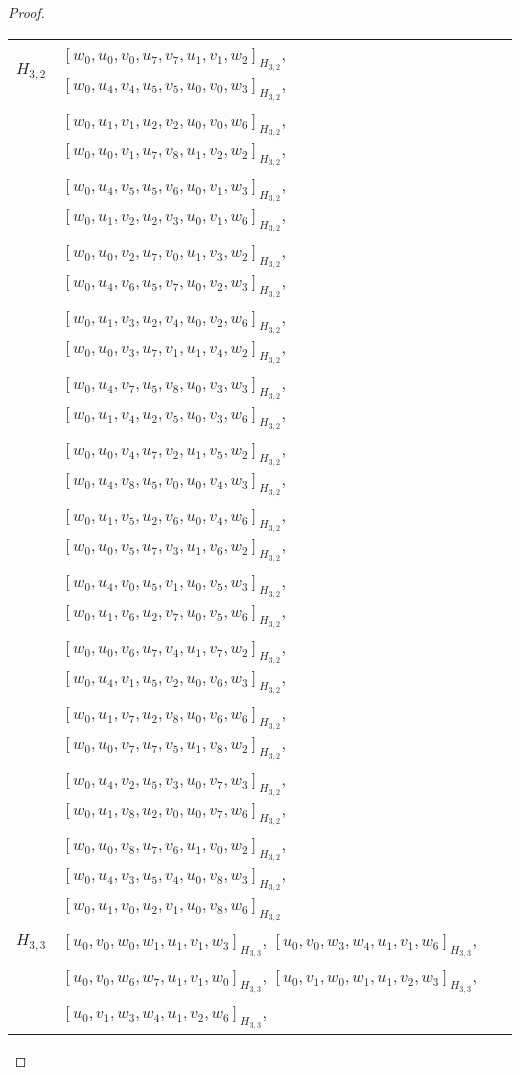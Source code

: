 \begin{subappendices}
\begin{proof}
{ \small
\begin{longtable}{|c|l|}
\hline
$H_{3,2}$ &
  $[w_0, u_0, v_0, u_7, v_7, u_1, v_1, w_2]_{H_{3,2}}$,
  $[w_0, u_4, v_4, u_5, v_5, u_0, v_0, w_3]_{H_{3,2}}$, \\* &
  $[w_0, u_1, v_1, u_2, v_2, u_0, v_0, w_6]_{H_{3,2}}$,
  $[w_0, u_0, v_1, u_7, v_8, u_1, v_2, w_2]_{H_{3,2}}$, \\* &
  $[w_0, u_4, v_5, u_5, v_6, u_0, v_1, w_3]_{H_{3,2}}$,
  $[w_0, u_1, v_2, u_2, v_3, u_0, v_1, w_6]_{H_{3,2}}$, \\* &
  $[w_0, u_0, v_2, u_7, v_0, u_1, v_3, w_2]_{H_{3,2}}$,
  $[w_0, u_4, v_6, u_5, v_7, u_0, v_2, w_3]_{H_{3,2}}$, \\* &
  $[w_0, u_1, v_3, u_2, v_4, u_0, v_2, w_6]_{H_{3,2}}$,
  $[w_0, u_0, v_3, u_7, v_1, u_1, v_4, w_2]_{H_{3,2}}$, \\* &
  $[w_0, u_4, v_7, u_5, v_8, u_0, v_3, w_3]_{H_{3,2}}$,
  $[w_0, u_1, v_4, u_2, v_5, u_0, v_3, w_6]_{H_{3,2}}$, \\* &
  $[w_0, u_0, v_4, u_7, v_2, u_1, v_5, w_2]_{H_{3,2}}$,
  $[w_0, u_4, v_8, u_5, v_0, u_0, v_4, w_3]_{H_{3,2}}$, \\* &
  $[w_0, u_1, v_5, u_2, v_6, u_0, v_4, w_6]_{H_{3,2}}$,
  $[w_0, u_0, v_5, u_7, v_3, u_1, v_6, w_2]_{H_{3,2}}$, \\* &
  $[w_0, u_4, v_0, u_5, v_1, u_0, v_5, w_3]_{H_{3,2}}$,
  $[w_0, u_1, v_6, u_2, v_7, u_0, v_5, w_6]_{H_{3,2}}$, \\* &
  $[w_0, u_0, v_6, u_7, v_4, u_1, v_7, w_2]_{H_{3,2}}$,
  $[w_0, u_4, v_1, u_5, v_2, u_0, v_6, w_3]_{H_{3,2}}$, \\* &
  $[w_0, u_1, v_7, u_2, v_8, u_0, v_6, w_6]_{H_{3,2}}$,
  $[w_0, u_0, v_7, u_7, v_5, u_1, v_8, w_2]_{H_{3,2}}$, \\* &
  $[w_0, u_4, v_2, u_5, v_3, u_0, v_7, w_3]_{H_{3,2}}$,
  $[w_0, u_1, v_8, u_2, v_0, u_0, v_7, w_6]_{H_{3,2}}$, \\* &
  $[w_0, u_0, v_8, u_7, v_6, u_1, v_0, w_2]_{H_{3,2}}$,
  $[w_0, u_4, v_3, u_5, v_4, u_0, v_8, w_3]_{H_{3,2}}$, \\* &
  $[w_0, u_1, v_0, u_2, v_1, u_0, v_8, w_6]_{H_{3,2}}$
\\ \hline
$H_{3,3}$ &
  $[u_0, v_0, w_0, w_1, u_1, v_1, w_3]_{H_{3,3}}$,
  $[u_0, v_0, w_3, w_4, u_1, v_1, w_6]_{H_{3,3}}$, \\* &
  $[u_0, v_0, w_6, w_7, u_1, v_1, w_0]_{H_{3,3}}$,
  $[u_0, v_1, w_0, w_1, u_1, v_2, w_3]_{H_{3,3}}$, \\* &
  $[u_0, v_1, w_3, w_4, u_1, v_2, w_6]_{H_{3,3}}$,

\end{longtable}}
\end{proof}
\end{subappendices}
